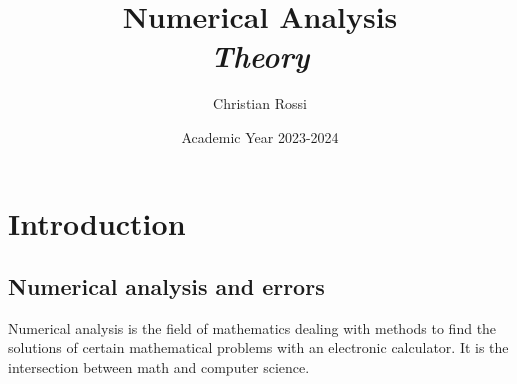 \documentclass[12pt, a4paper]{report}
\title{Numerical Analysis \\ \textit{Theory}}
\author{Christian Rossi}
\date{Academic Year 2023-2024}
\theoremstyle{remark}
\begin{document}
\maketitle

\newpage

\begin{abstract}



\end{abstract}

\newpage

\tableofcontents

\newpage

\chapter{Introduction}
\section{Numerical analysis and errors}
Numerical analysis is the field of mathematics dealing with methods to find the solutions of certain mathematical problems with an electronic 
calculator. It is the intersection between math and computer science. 
\end{document}
